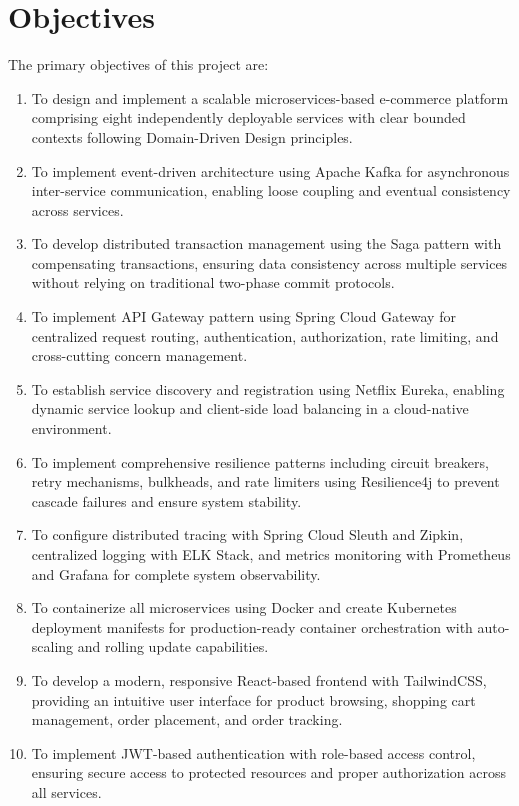 \section{Objectives}

The primary objectives of this project are:

\begin{enumerate}
    \item To design and implement a scalable microservices-based e-commerce platform comprising eight independently deployable services with clear bounded contexts following Domain-Driven Design principles.
    
    \item To implement event-driven architecture using Apache Kafka for asynchronous inter-service communication, enabling loose coupling and eventual consistency across services.
    
    \item To develop distributed transaction management using the Saga pattern with compensating transactions, ensuring data consistency across multiple services without relying on traditional two-phase commit protocols.
    
    \item To implement API Gateway pattern using Spring Cloud Gateway for centralized request routing, authentication, authorization, rate limiting, and cross-cutting concern management.
    
    \item To establish service discovery and registration using Netflix Eureka, enabling dynamic service lookup and client-side load balancing in a cloud-native environment.
    
    \item To implement comprehensive resilience patterns including circuit breakers, retry mechanisms, bulkheads, and rate limiters using Resilience4j to prevent cascade failures and ensure system stability.
    
    \item To configure distributed tracing with Spring Cloud Sleuth and Zipkin, centralized logging with ELK Stack, and metrics monitoring with Prometheus and Grafana for complete system observability.
    
    \item To containerize all microservices using Docker and create Kubernetes deployment manifests for production-ready container orchestration with auto-scaling and rolling update capabilities.
    
    \item To develop a modern, responsive React-based frontend with TailwindCSS, providing an intuitive user interface for product browsing, shopping cart management, order placement, and order tracking.
    
    \item To implement JWT-based authentication with role-based access control, ensuring secure access to protected resources and proper authorization across all services.
\end{enumerate}

